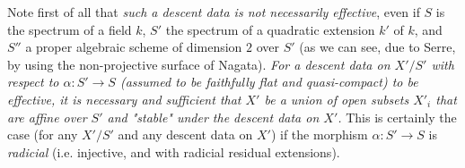   Note first of all that \emph{such a descent data is not necessarily effective}, even if \(S\) is the spectrum of a field \(k\), \(S'\) the spectrum of a quadratic extension \(k'\) of \(k\), and \(S''\) a proper algebraic scheme of dimension \(2\) over \(S'\) (as we can see, due to Serre, by using the non-projective surface of Nagata).
  \emph{For a descent data on \(X'/S'\) with respect to \(\alpha \colon  S'\to  S\) (assumed to be faithfully flat and quasi-compact) to be effective, it is necessary and sufficient that \(X'\) be a union of open subsets \(X'_i\) that are affine over \(S'\) and "stable" under the descent data on \(X'\).}
  This is certainly the case (for any \(X'/S'\) and any descent data on \(X'\)) if the morphism \(\alpha \colon  S'\to  S\) is \emph{radicial} (i.e. injective, and with radicial residual extensions).
  
